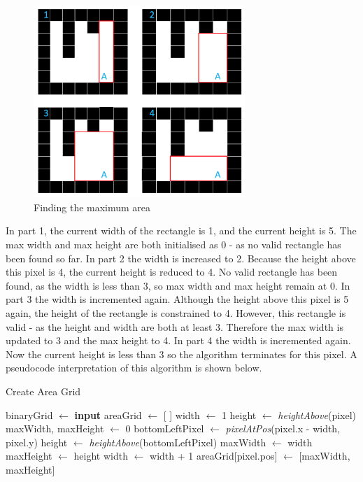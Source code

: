 \documentclass[titlepage]{article}
\begin{document}
\begin{figure}[H]
  \centering
  \includegraphics[width=8cm]{rectsteps.png}
  \caption{Finding the maximum area}
  \label{fig:dijk}
\end{figure}

In part 1, the current width of the rectangle is 1, and the current height is 5. The max width and max height are both initialised as 0 - as no valid rectangle has been found so far. In part 2 the width is increased to 2. Because the height above this pixel is 4, the current height is reduced to 4. No valid rectangle has been found, as the width is less than 3, so max width and max height remain at 0. In part 3 the width is incremented again. Although the height above this pixel is 5 again, the height of the rectangle is constrained to 4. However, this rectangle is valid - as the height and width are both at least 3. Therefore the max width is updated to 3 and the max height to 4. In part 4 the width is incremented again. Now the current height is less than 3 so the algorithm terminates for this pixel. A pseudocode interpretation of this algorithm is shown below.

\begin{algorithm}[H]
\caption{Create Area Grid}
\begin{algorithmic}[1]
    	\State binaryGrid $\gets$ \textbf{input}
    	\State areaGrid $\gets$ [ ]
		\State width $\gets$ 1
		\State height $\gets$ \textit{heightAbove}(pixel)
		\State maxWidth, maxHeight $\gets$ 0
			\State bottomLeftPixel $\gets$ \textit{pixelAtPos}(pixel.x - width, pixel.y)
            			\State height $\gets$ \textit{heightAbove}(bottomLeftPixel)
			\EndIf
					\State maxWidth $\gets$ width
					\State maxHeight $\gets$ height
				\EndIf
			\EndIf
			\State width $\gets$ width + 1
           	\EndWhile
		\State areaGrid[pixel.pos] $\gets$ [maxWidth, maxHeight]
        \EndFor
\end{algorithmic}
\end{algorithm}
\end{document}
